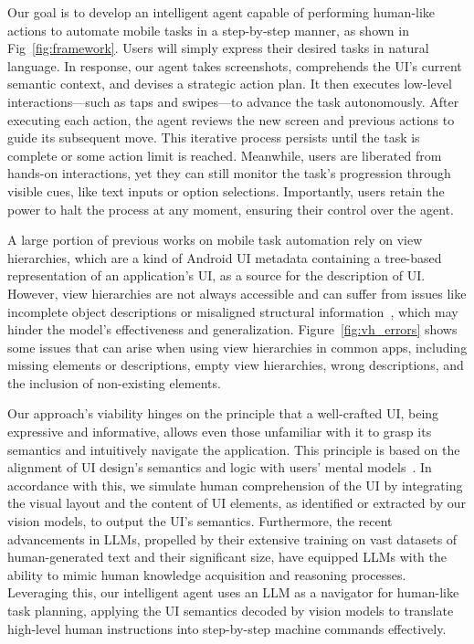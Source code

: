 Our goal is to develop an intelligent agent capable of performing human-like actions to automate mobile tasks in a step-by-step manner, as shown in Fig~\ref{fig:framework}. Users will simply express their desired tasks in natural language. In response, our agent takes screenshots, comprehends the UI's current semantic context, and devises a strategic action plan. It then executes low-level interactions—such as taps and swipes—to advance the task autonomously. After executing each action, the agent reviews the new screen and previous actions to guide its subsequent move. This iterative process persists until the task is complete or some action limit is reached. Meanwhile, users are liberated from hands-on interactions, yet they can still monitor the task's progression through visible cues, like text inputs or option selections. Importantly, users retain the power to halt the process at any moment, ensuring their control over the agent. 

A large portion of previous works on mobile task automation rely on view hierarchies, which are a kind of Android UI metadata containing a tree-based representation of an application's UI, as a source for the description of UI. However, view hierarchies are not always accessible and can suffer from issues like incomplete object descriptions or misaligned structural information~\cite{ross2018examining,li2022learning,XDA}, which may hinder the model's effectiveness and generalization. Figure~\ref{fig:vh_errors} shows some issues that can arise when using view hierarchies in common apps, including missing elements or descriptions, empty view hierarchies, wrong descriptions, and the inclusion of non-existing elements.

Our approach's viability hinges on the principle that a well-crafted UI, being expressive and informative, allows even those unfamiliar with it to grasp its semantics and intuitively navigate the application. This principle is based on the alignment of UI design's semantics and logic with users' mental models~\cite{nielsen1994enhancing}. In accordance with this, we simulate human comprehension of the UI by integrating the visual layout and the content of UI elements, as identified or extracted by our vision models, to output the UI's semantics. Furthermore, the recent advancements in LLMs, propelled by their extensive training on vast datasets of human-generated text and their significant size, have equipped LLMs with the ability to mimic human knowledge acquisition and reasoning processes. Leveraging this, our intelligent agent uses an LLM as a navigator for human-like task planning, applying the UI semantics decoded by vision models to translate high-level human instructions into step-by-step machine commands effectively.

